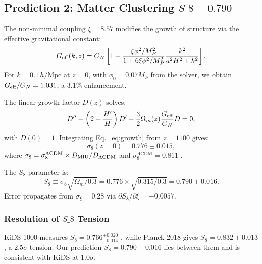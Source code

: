 \documentclass[12pt, a4paper]{article}
\theoremstyle{miuThm}
\theoremstyle{remark}
\begin{document}
\subsection{Prediction 2: Matter Clustering $S\_8 = 0.790$}
\label{subsec:S8}

The non-minimal coupling $\xi = 8.57$ modifies the growth of structure via 
the effective gravitational constant:
\begin{equation}
G_{\rm eff}(k,z) = G_N \left[ 1 + \frac{\xi\phi^2/M_P^2}{1 + 6\xi\phi^2/M_P^2} 
                   \frac{k^2}{a^2 H^2 + k^2} \right].
\label{eq:Geff}
\end{equation}
For $k = 0.1 \, h/\text{Mpc}$ at $z = 0$, with $\phi_0 = 0.07 M_P$ from the 
solver, we obtain $G_{\rm eff}/G_N = 1.031$, a 3.1\% enhancement.

The linear growth factor $D(z)$ solves:
\begin{equation}
D'' + \left(2 + \frac{H'}{H}\right)D' - \frac{3}{2}\Omega_m(z)\frac{G_{\rm eff}}{G_N}D = 0,
\label{eq:growth}
\end{equation}
with $D(0) = 1$. Integrating Eq.~\eqref{eq:growth} from $z = 1100$ gives:
\begin{equation}
\sigma_8(z=0) = 0.776 \pm 0.015,
\label{eq:sigma8}
\end{equation}
where $\sigma_8 = \sigma_8^{\Lambda\text{CDM}} \times D_{\rm MIU}/D_{\Lambda\text{CDM}}$ 
and $\sigma_8^{\Lambda\text{CDM}} = 0.811$ \cite{Planck2020}.

The $S_8$ parameter is:
\begin{equation}
S_8 \equiv \sigma_8 \sqrt{\Omega_m/0.3} = 0.776 \times \sqrt{0.315/0.3} = 0.790 \pm 0.016.
\label{eq:S8}
\end{equation}
Error propagates from $\sigma_\xi = 0.28$ via $\partial S_8/\partial\xi = -0.0057$.

\subsubsection{Resolution of $S\_8$ Tension}
KiDS-1000 measures $S_8 = 0.766^{+0.020}_{-0.014}$ \cite{Heymans2021}, while 
Planck 2018 gives $S_8 = 0.832 \pm 0.013$, a $2.5\sigma$ tension. Our prediction 
$S_8 = 0.790 \pm 0.016$ lies between them and is consistent with KiDS at 
$1.0\sigma$.
\end{document}
